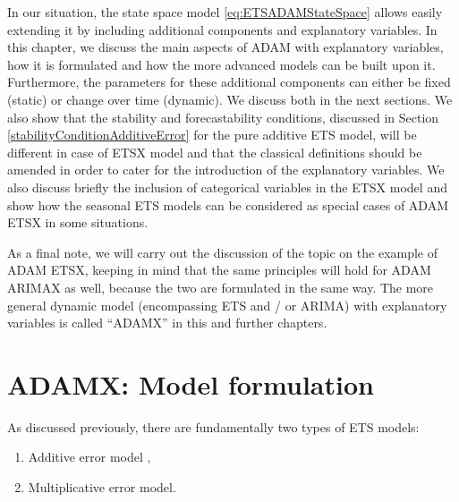 \documentclass[
]{book}
\providecommand{\tightlist}{%
  \setlength{\itemsep}{0pt}\setlength{\parskip}{0pt}}
\theoremstyle{definition}
\theoremstyle{definition}
\theoremstyle{definition}
\theoremstyle{definition}
\theoremstyle{remark}
\begin{document}
In our situation, the state space model \eqref{eq:ETSADAMStateSpace} allows easily extending it by including additional components and explanatory variables. In this chapter, we discuss the main aspects of ADAM with explanatory variables, how it is formulated and how the more advanced models can be built upon it. Furthermore, the parameters for these additional components can either be fixed (static) or change over time (dynamic). We discuss both in the next sections. We also show that the stability and forecastability conditions, discussed in Section \ref{stabilityConditionAdditiveError} for the pure additive ETS model, will be different in case of ETSX model and that the classical definitions should be amended in order to cater for the introduction of the explanatory variables. We also discuss briefly the inclusion of categorical variables in the ETSX model and show how the seasonal ETS models can be considered as special cases of ADAM ETSX in some situations.

As a final note, we will carry out the discussion of the topic on the example of ADAM ETSX, keeping in mind that the same principles will hold for ADAM ARIMAX as well, because the two are formulated in the same way. The more general dynamic model (encompassing ETS and / or ARIMA) with explanatory variables is called ``ADAMX'' in this and further chapters.

\hypertarget{adamx-model-formulation}{%
\section{ADAMX: Model formulation}\label{adamx-model-formulation}}

As discussed previously, there are fundamentally two types of ETS models:

\begin{enumerate}
\def\labelenumi{\arabic{enumi}.}
\tightlist
\item
  Additive error model \citep[which was discussed in][ in Chapter 9]{Hyndman2008b},
\item
  Multiplicative error model.
\end{enumerate}
\end{document}
